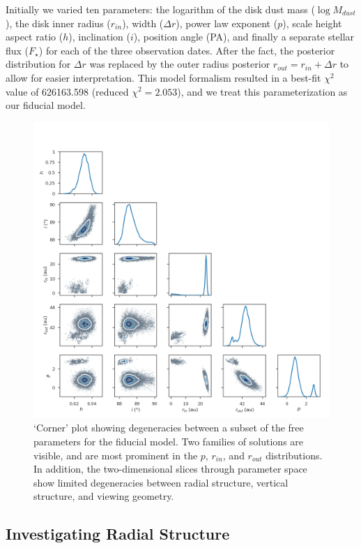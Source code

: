 \documentclass[modern]{aastex62}
\begin{document}
Initially we varied ten parameters: the logarithm of the disk dust mass ($\log M_{dust}$), the disk inner radius ($r_{in}$), width ($\Delta r$), power law exponent ($p$), scale height aspect ratio ($h$), inclination ($i$), position angle (PA), and finally a separate stellar flux ($F_\star$) for each of the three observation dates. 
After the fact, the posterior distribution for $\Delta r$ was replaced by the outer radius posterior $r_{out} = r_{in} + \Delta r$ to allow for easier interpretation.
This model formalism resulted in a best-fit $\chi^2$ value of 626163.598 (reduced $\chi^2=2.053$), and we treat this parameterization as our fiducial model.

\begin{figure}
  \centering
  \includegraphics[width=0.9\linewidth]{../figures/degeneracy_corner}
  \caption{`Corner' plot showing degeneracies between a subset of the free parameters for the fiducial model.
  Two families of solutions are visible, and are most prominent in the $p$, $r_{in}$, and $r_{out}$ distributions.
  In addition, the two-dimensional slices through parameter space show limited degeneracies between radial structure, vertical structure, and viewing geometry.}
  \label{fig: degeneracies}
\end{figure}

\subsection{Investigating Radial Structure}
\label{subsection: radial analysis}
\end{document}
